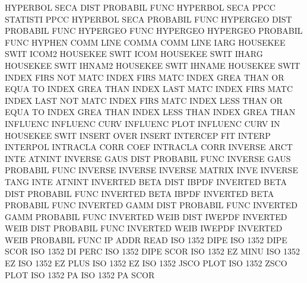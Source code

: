 HYPERBOL SECA DIST                      PROBABIL FUNC
HYPERBOL SECA PPCC                      STATISTI PPCC
HYPERBOL SECA                           PROBABIL FUNC
HYPERGEO DIST                           PROBABIL FUNC
HYPERGEO FUNC                           HYPERGEO
HYPERGEO                                PROBABIL FUNC
HYPHEN   COMM LINE                      COMMA    COMM LINE
IARG                                    HOUSEKEE SWIT
ICOM2                                   HOUSEKEE SWIT
ICOM                                    HOUSEKEE SWIT
IHARG                                   HOUSEKEE SWIT
IHNAM2                                  HOUSEKEE SWIT
IHNAME                                  HOUSEKEE SWIT
INDEX    FIRS NOT  MATC                 INDEX    FIRS MATC
INDEX    GREA THAN OR   EQUA TO         INDEX    GREA THAN
INDEX    LAST MATC                      INDEX    FIRS MATC
INDEX    LAST NOT  MATC                 INDEX    FIRS MATC
INDEX    LESS THAN OR   EQUA TO         INDEX    GREA THAN
INDEX    LESS THAN                      INDEX    GREA THAN
INFLUENC                                INFLUENC CURV
INFLUENC PLOT                           INFLUENC CURV
IN                                      HOUSEKEE SWIT
INSERT   OVER                           INSERT
INTERCEP                                FIT
INTERP                                  INTERPOL
INTRACLA CORR COEF                      INTRACLA CORR
INVERSE  ARCT INTE                      ATNINT
INVERSE  GAUS DIST                      PROBABIL FUNC
INVERSE  GAUS                           PROBABIL FUNC
INVERSE                                 INVERSE
INVERSE                                 MATRIX   INVE
INVERSE  TANG INTE                      ATNINT
INVERTED BETA DIST                      IBPDF
INVERTED BETA DIST                      PROBABIL FUNC
INVERTED BETA                           IBPDF
INVERTED BETA                           PROBABIL FUNC
INVERTED GAMM DIST                      PROBABIL FUNC
INVERTED GAMM                           PROBABIL FUNC
INVERTED WEIB DIST                      IWEPDF
INVERTED WEIB DIST                      PROBABIL FUNC
INVERTED WEIB                           IWEPDF
INVERTED WEIB                           PROBABIL FUNC
IP       ADDR                           READ
ISO      1352 DIPE                      ISO      1352 DIPE SCOR
ISO      1352 DI   PERC                 ISO      1352 DIPE SCOR
ISO      1352 EZ   MINU                 ISO      1352 EZ
ISO      1352 EZ   PLUS                 ISO      1352 EZ
ISO      1352 JSCO PLOT                 ISO      1352 ZSCO PLOT
ISO      1352 PA                        ISO      1352 PA   SCOR
